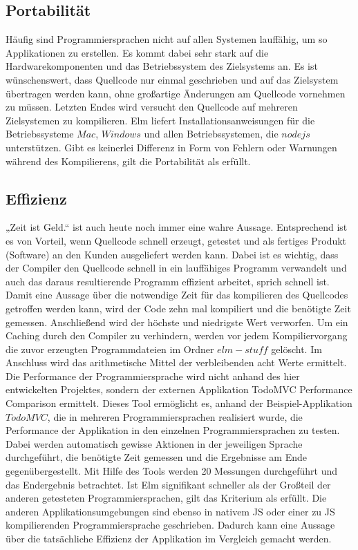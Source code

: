 \subsection{Portabilität}
\label{sec:muster_portabilitaet}
Häufig sind Programmiersprachen nicht auf allen Systemen lauffähig, um so Applikationen zu erstellen. Es kommt dabei sehr stark auf die Hardwarekomponenten und das Betriebssystem des Zielsystems an. Es ist wünschenswert, dass Quellcode nur einmal geschrieben und auf das Zielsystem übertragen werden kann, ohne großartige Änderungen am Quellcode vornehmen zu müssen. Letzten Endes wird versucht den Quellcode auf mehreren Zielsystemen zu kompilieren. Elm liefert Installationsanweisungen für die Betriebssysteme $Mac$, $Windows$ und allen Betriebssystemen, die $nodejs$ unterstützen. Gibt es keinerlei Differenz in Form von Fehlern oder Warnungen während des Kompilierens, gilt die Portabilität als erfüllt.


\subsection{Effizienz}
\label{sec:muster_effizienz}
„Zeit ist Geld.“ ist auch heute noch immer eine wahre Aussage. Entsprechend ist es von Vorteil, wenn Quellcode schnell erzeugt, getestet und als fertiges Produkt (Software) an den Kunden ausgeliefert werden kann. Dabei ist es wichtig, dass der Compiler den Quellcode schnell in ein lauffähiges Programm verwandelt und auch das daraus resultierende Programm effizient arbeitet, sprich schnell ist. Damit eine Aussage über die notwendige Zeit für das kompilieren des Quellcodes getroffen werden kann, wird der Code zehn mal kompiliert und die benötigte Zeit gemessen. Anschließend wird der höchste und niedrigste Wert verworfen. Um ein Caching durch den Compiler zu verhindern, werden vor jedem Kompiliervorgang die zuvor erzeugten Programmdateien im Ordner $elm-stuff$ gelöscht. Im Anschluss wird das arithmetische Mittel der verbleibenden acht Werte ermittelt.
Die Performance der Programmiersprache wird nicht anhand des hier entwickelten Projektes, sondern der externen Applikation \cite{https://github.com/evancz/todomvc-perf-comparison/} TodoMVC Performance Comparison ermittelt. Dieses Tool ermöglicht es, anhand der Beispiel-Applikation $TodoMVC$, die in mehreren Programmiersprachen realisiert wurde, die Performance der Applikation in den einzelnen Programmiersprachen zu testen. Dabei werden automatisch gewisse Aktionen in der jeweiligen Sprache durchgeführt, die benötigte Zeit gemessen und die Ergebnisse am Ende gegenübergestellt. Mit Hilfe des Tools werden 20 Messungen durchgeführt und das Endergebnis betrachtet. Ist Elm signifikant schneller als der Großteil der anderen getesteten Programmiersprachen, gilt das Kriterium als erfüllt. Die anderen Applikationsumgebungen sind ebenso in nativem \ac{JS} oder einer zu \ac{JS} kompilierenden Programmiersprache geschrieben. Dadurch kann eine Aussage über die tatsächliche Effizienz der Applikation im Vergleich gemacht werden.


